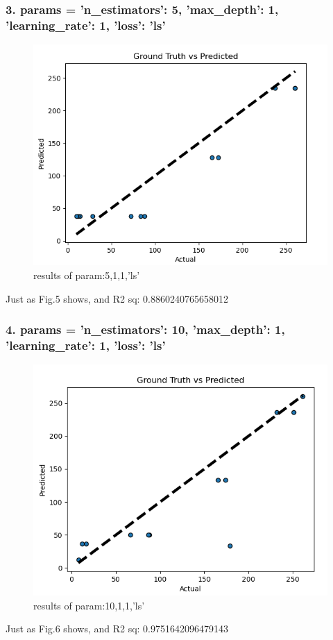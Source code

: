 \documentclass[a4paper,12pt]{journal}
\begin{document}
	\subsubsection*{3. params = {'n\_estimators': 5, 'max\_depth': 1, 'learning\_rate': 1, 'loss': 'ls'}}
	\begin{figure}[htbp]
		\centering
		\includegraphics[scale=0.8]{1_c_3.png}
		\caption{results of param:5,1,1,'ls'}
	\end{figure}
	Just as Fig.5 shows, and R2 sq:  0.8860240765658012
	\subsubsection*{4. params = {'n\_estimators': 10, 'max\_depth': 1, 'learning\_rate': 1, 'loss': 'ls'}}
	\begin{figure}[htbp]
		\centering
		\includegraphics[scale=0.8]{1_c_4.png}
		\caption{results of param:10,1,1,'ls'}
	\end{figure}
	Just as Fig.6 shows, and R2 sq:  0.9751642096479143
\end{document}
